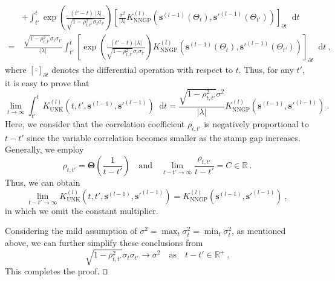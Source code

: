 \documentclass[review,10pt]{JMtemplate}
\newcommand*{\dif}{\mathop{}\!\mathrm{d}}
\begin{document}
\begin{itemize}
\[\begin{aligned}
       &+ \int_{t'}^t \exp\left( \frac{ (t'-t) ~|\lambda|}{\sqrt{1-\rho_{t,t'}^2}\sigma_{t}\sigma_{t'}} \right) \left[ \frac{\sigma^2}{|\lambda|} K_{\textrm{NNGP}}^{(l)} \left( \boldsymbol{s}^{(l-1)}(\Theta_t), \boldsymbol{s}'^{(l-1)}(\Theta_{t'}) \right) \right]_{\partial t}  \dif t \\
       =&~ \frac{\sqrt{1-\rho_{t,t'}^2}\sigma_{t}\sigma_{t'}}{|\lambda|} \int_{t'}^t \left[  \exp\left( \frac{ (t'-t) ~|\lambda|}{\sqrt{1-\rho_{t,t'}^2}\sigma_{t}\sigma_{t'}} \right) K_{\textrm{NNGP}}^{(l)} \left( \boldsymbol{s}^{(l-1)}(\Theta_t), \boldsymbol{s}'^{(l-1)}(\Theta_{t'}) \right)  \right]_{\partial t}  \dif t \ ,
    \end{aligned}
    \]
    where $[\cdot]_{\partial t}$ denotes the differential operation with respect to $t$. Thus, for any $t'$, it is easy to prove that 
    \[
    \lim\limits_{t\to\infty} \int_{t'}^t K_{\textrm{UNK}}^{(l)} \left( t, t', \boldsymbol{s}^{(l-1)}, \boldsymbol{s}'^{(l-1)} \right) \dif t = \frac{\sqrt{1-\rho_{t,t'}^2}\sigma^2}{|\lambda|} K_{\textrm{NNGP}}^{(l)} \left( \boldsymbol{s}^{(l-1)}, \boldsymbol{s}'^{(l-1)}\right) \ .
    \]
    Here, we consider that the correlation coefficient $\rho_{t,t'}$ is negatively proportional to $t-t'$ since the variable correlation becomes smaller as the stamp gap increases. Generally, we employ 
    \[
    \rho_{t,t'} = \mathbf{\Theta} \left( \frac{1}{t-t'} \right)
    \quad\textrm{and}\quad
    \lim\limits_{t-t' \to \infty} \frac{\rho_{t,t'}}{t-t'} = C \in \mathbb{R} \ .
    \]
    Thus, we can obtain 
    \[
    \lim\limits_{t-t' \to \infty} K_{\textrm{UNK}}^{(l)} \left( t, t', \boldsymbol{s}^{(l-1)}, \boldsymbol{s}'^{(l-1)} \right) = K_{\textrm{NNGP}}^{(l)} \left(  \boldsymbol{s}^{(l-1)}, \boldsymbol{s}'^{(l-1)} \right) \ ,
    \]
    in which we omit the constant multiplier.
\end{itemize}

Considering the mild assumption of $\sigma^2 = \max_t \sigma_t^2 = \min_t \sigma_t^2$, as mentioned above, we can further simplify these conclusions from
\[
\sqrt{1-\rho_{t,t'}^2}\sigma_{t}\sigma_{t'} \to \sigma^2 
\quad\textrm{as}\quad
t-t' \in \mathbb{R}^+ \ .
\]
This completes the proof. $\hfill\square$
\end{document}
